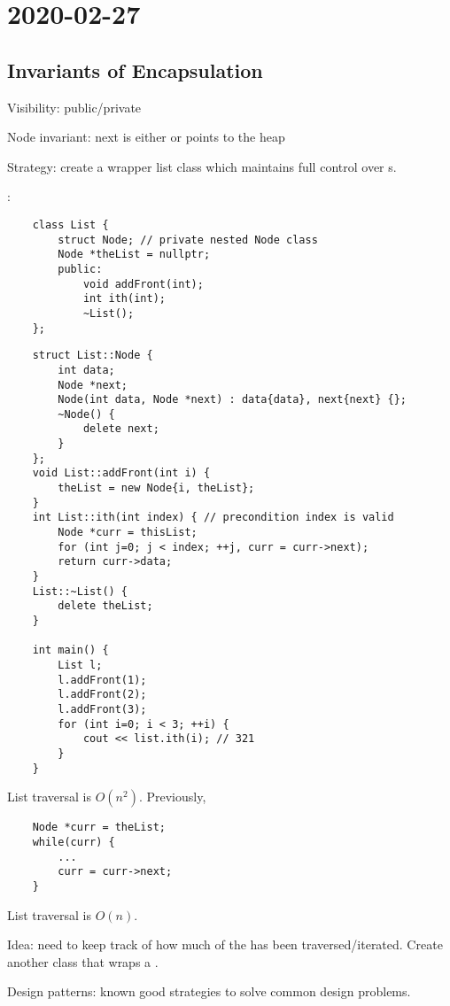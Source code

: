 \section{2020-02-27}
\subsection{Invariants of Encapsulation}
Visibility: public/private

Node invariant: next is either  or points to the heap

Strategy: create a wrapper list class which maintains full control over s.

: 
\begin{lstlisting}
    class List {
        struct Node; // private nested Node class
        Node *theList = nullptr;
        public:
            void addFront(int);
            int ith(int);
            ~List();
    };
\end{lstlisting}
\begin{lstlisting}
    struct List::Node {
        int data;
        Node *next;
        Node(int data, Node *next) : data{data}, next{next} {};
        ~Node() {
            delete next;
        }
    };
    void List::addFront(int i) {
        theList = new Node{i, theList};
    }
    int List::ith(int index) { // precondition index is valid
        Node *curr = thisList;
        for (int j=0; j < index; ++j, curr = curr->next);
        return curr->data;
    }
    List::~List() {
        delete theList;
    }
    
    int main() {
        List l;
        l.addFront(1);
        l.addFront(2);
        l.addFront(3);
        for (int i=0; i < 3; ++i) {
            cout << list.ith(i); // 321
        }
    }
\end{lstlisting}
List traversal is $ O(n^2) $.
Previously,
\begin{lstlisting}
    Node *curr = theList;
    while(curr) {
        ...
        curr = curr->next;
    }
\end{lstlisting}
List traversal is $ O(n) $.

Idea: need to keep track of how much of the  has been traversed/iterated.
Create another class that wraps a .

Design patterns: known good strategies to solve common design problems.

